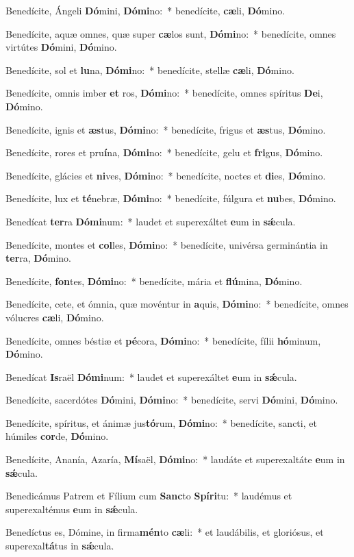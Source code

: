 \item Benedícite, Ángeli \textbf{Dó}mini, \textbf{Dó}\textbf{mi}no:~* benedícite, \textbf{cæ}li, \textbf{Dó}mino.
\item Benedícite, aquæ omnes, quæ super \textbf{cæ}los sunt, \textbf{Dó}\textbf{mi}no:~* benedícite, omnes virtútes \textbf{Dó}mini, \textbf{Dó}mino.
\item Benedícite, sol et \textbf{lu}na, \textbf{Dó}\textbf{mi}no:~* benedícite, stellæ \textbf{cæ}li, \textbf{Dó}mino.
\item Benedícite, omnis imber \textbf{et} ros, \textbf{Dó}\textbf{mi}no:~* benedícite, omnes spíritus \textbf{De}i, \textbf{Dó}mino.
\item Benedícite, ignis et \textbf{æs}tus, \textbf{Dó}\textbf{mi}no:~* benedícite, frigus et \textbf{æs}tus, \textbf{Dó}mino.
\item Benedícite, rores et pru\textbf{í}na, \textbf{Dó}\textbf{mi}no:~* benedícite, gelu et \textbf{fri}gus, \textbf{Dó}mino.
\item Benedícite, glácies et \textbf{ni}ves, \textbf{Dó}\textbf{mi}no:~* benedícite, noctes et \textbf{di}es, \textbf{Dó}mino.
\item Benedícite, lux et \textbf{té}nebræ, \textbf{Dó}\textbf{mi}no:~* benedícite, fúlgura et \textbf{nu}bes, \textbf{Dó}mino.
\item Benedícat \textbf{ter}ra \textbf{Dó}\textbf{mi}num:~* laudet et superexáltet \textbf{e}um in \textbf{sǽ}cula.
\item Benedícite, montes et \textbf{col}les, \textbf{Dó}\textbf{mi}no:~* benedícite, univérsa germinántia in \textbf{ter}ra, \textbf{Dó}mino.
\item Benedícite, \textbf{fon}tes, \textbf{Dó}\textbf{mi}no:~* benedícite, mária et \textbf{flú}mina, \textbf{Dó}mino.
\item Benedícite, cete, et ómnia, quæ movéntur in \textbf{a}quis, \textbf{Dó}\textbf{mi}no:~* benedícite, omnes vólucres \textbf{cæ}li, \textbf{Dó}mino.
\item Benedícite, omnes béstiæ et \textbf{pé}cora, \textbf{Dó}\textbf{mi}no:~* benedícite, fílii \textbf{hó}minum, \textbf{Dó}mino.
\item Benedícat \textbf{Is}raël \textbf{Dó}\textbf{mi}num:~* laudet et superexáltet \textbf{e}um in \textbf{sǽ}cula.
\item Benedícite, sacerdótes \textbf{Dó}mini, \textbf{Dó}\textbf{mi}no:~* benedícite, servi \textbf{Dó}mini, \textbf{Dó}mino.
\item Benedícite, spíritus, et ánimæ jus\textbf{tó}rum, \textbf{Dó}\textbf{mi}no:~* benedícite, sancti, et húmiles \textbf{cor}de, \textbf{Dó}mino.
\item Benedícite, Ananía, Azaría, \textbf{Mí}saël, \textbf{Dó}\textbf{mi}no:~* laudáte et superexaltáte \textbf{e}um in \textbf{sǽ}cula.
\item Benedicámus Patrem et Fílium cum \textbf{Sanc}to \textbf{Spí}\textbf{ri}tu:~* laudémus et superexaltémus \textbf{e}um in \textbf{sǽ}cula.
\item Benedíctus es, Dómine, in firma\textbf{mén}to \textbf{cæ}li:~* et laudábilis, et gloriósus, et superexal\textbf{tá}tus in \textbf{sǽ}cula.
